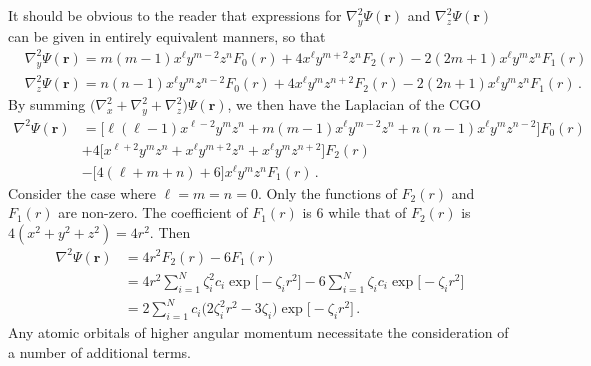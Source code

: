 %
It should be obvious to the reader that expressions for $\nabla^2_y \Psi(\mathbf{r})$ and 
$\nabla^2_z \Psi(\mathbf{r})$ can be given in entirely equivalent manners, so that
%
\begin{align}
	&\nabla^2_y \Psi(\mathbf{r})= m(m-1)x^\ell y^{m-2} z^n F_0(r) + 4x^\ell y^{m+2} z^n F_2(r) - 2(2m+1) x^\ell y^m z^n F_1(r) \\
    &\nabla^2_z \Psi(\mathbf{r})= n(n-1)x^\ell y^{m} z^{n-2} F_0(r) + 4x^\ell y^{m} z^{n+2} F_2(r) - 2(2n+1) x^\ell y^m z^n F_1(r) \,.
\end{align}
%
By summing $\Big( \nabla^2_x + \nabla^2_y + \nabla^2_z \Big)\Psi(\mathbf{r})$, we then have 
the Laplacian of the CGO
%
\begin{align}
	\nabla^2 \Psi(\mathbf{r}) &= \Big[ \ell(\ell-1)x^{\ell-2} y^m z^n + m(m-1)x^\ell y^{m-2} z^n + n(n-1)x^\ell y^{m} z^{n-2} \Big] F_0(r) \nonumber \\
    & + 4\Big[x^{\ell+2} y^m z^n + x^\ell y^{m+2} z^n + x^\ell y^{m} z^{n+2} \Big] F_2(r) \nonumber \\
    &- \Big[ 4(\ell + m + n) + 6 \Big] x^\ell y^m z^n F_1(r) \,.
\end{align}
%
Consider the case where $\ell = m = n = 0$. Only the functions of $F_2(r)$ and $F_1(r)$ 
are non-zero. The coefficient of $F_1(r)$ is $6$ while that of $F_2(r)$ is $4(x^2 + y^2 + z^2) = 4r^2$. 
Then
%
\begin{align}
	\nabla^2 \Psi(\mathbf{r}) &= 4r^2 F_2(r) - 6 F_1(r) \nonumber \\
    &= 4r^2 \sum_{i=1}^N \zeta_i^2 c_i \exp \Big[ -\zeta_i r^2 \Big] - 6 \sum_{i=1}^N \zeta_i c_i \exp \Big[ -\zeta_i r^2 \Big] \nonumber \\
    &= 2 \sum_{i=1}^N c_i \Big( 2\zeta_i^2 r^2 - 3\zeta_i \Big) \exp\Big[ -\zeta_i r^2 \Big] \,.
\end{align}
%
Any atomic orbitals of higher angular momentum necessitate the consideration of a number of 
additional terms.
